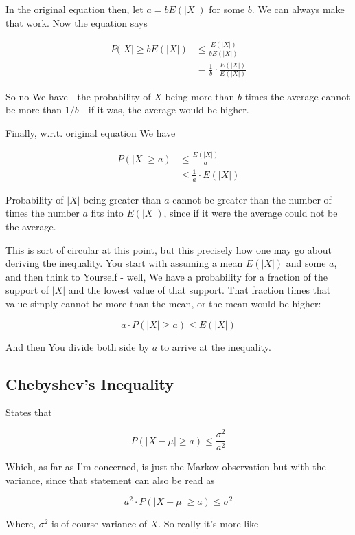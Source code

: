 \documentclass{article}
\begin{document}
		In the original equation then, let $a=bE(|X|)$ for some $b$. We can always make that work. Now the equation says
			
		\begin{align*}
		P(|X|\ge bE(|X|) &\le \frac{E(|X|)}{bE(|X|)}\\
		&= \frac{1}{b}\cdot\frac{E(|X|)}{E(|X|)}
		\end{align*}
			
		So no We have - the probability of $X$ being more than $b$ times the average cannot be more than $1/b$ - if it was, the average would be higher.
			
		Finally, w.r.t. original equation We have
			
		\begin{align*}
		 P(|X|\ge a) &\le \frac{E(|X|)}{a}\\
		 &\le \frac{1}{a}\cdot E(|X|)
		\end{align*}
			
		Probability of $|X|$ being greater than $a$ cannot be greater than the number of times the number $a$ fits into $E(|X|)$, since if it were the average could not be the average. 
			
		This is sort of circular at this point, but this precisely how one may go about deriving the inequality. You start with assuming a mean $E(|X|)$ and some $a$, and then think to Yourself - well, We have a probability for a fraction of the support of $|X|$ and the lowest value of that support. That fraction times that value simply cannot be more than the mean, or the mean would be higher:
			
		\[ a\cdot P(|X|\ge a) \le E(|X|) \]
			
		And then You divide both side by $a$ to arrive at the inequality.
		
	\subsection{Chebyshev's Inequality}
	
		States that
		
		\[ P(|X-\mu| \ge a) \le \frac{\sigma^2}{a^2} \]
			
		Which, as far as I'm concerned, is just the Markov observation but with the variance, since that statement can also be read as
			
		\[ a^2\cdot P(|X-\mu| \ge a) \le \sigma^2 \]	
			
		Where, $\sigma^2$ is of course variance of $X$. So really it's more like
		
\end{document}

